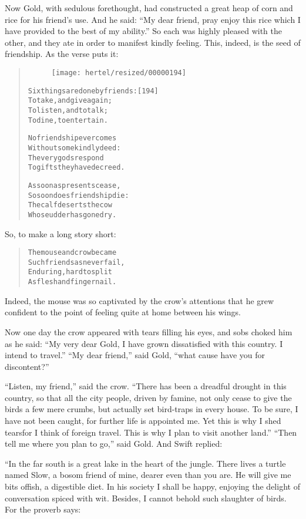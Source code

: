 \documentclass[article, twoside, 10pt]{memoir}
\renewenvironment{verbatim}{%
\begin{quote}%
\vskip -10pt%
\begin{alltt}\normalfont\small}{\end{alltt}%
\end{quote}%
\vskip -10pt
} %
\begin{document}
Now Gold, with sedulous forethought, had constructed a great heap
of corn and rice for his friend's use. And he said:
``My dear friend, pray enjoy this rice which I have provided to the best of my ability.''
So each was highly pleased with the other, and they ate in order to
manifest kindly feeling. This, indeed, is the seed of friendship.
As the verse puts it:

\begin{verbatim}
\begin{figure}[p]\texttt{[image: hertel/resized/00000194]}\end{figure}Six things are done by friends:                         [194]
    To take, and give again;
To listen, and to talk;
    To dine, to entertain.

No friendship ever comes
    Without some kindly deed:
The very gods respond
    To gifts they have decreed.

As soon as presents cease,
    So soon does friendship die:
The calf deserts the cow
    Whose udder has gone dry.
\end{verbatim}
So, to make a long story short:

\begin{verbatim}
The mouse and crow became
    Such friends as never fail,
Enduring, hard to split
    As flesh and finger nail.
\end{verbatim}
Indeed, the mouse was so captivated by the crow's attentions that
he grew confident to the point of feeling quite at home between his
wings.

Now one day the crow appeared with tears filling his eyes, and sobs
choked him as he said:
``My very dear Gold, I have grown dissatisfied with this country. I intend to travel.''
``My dear friend,'' said Gold,
``what cause have you for discontent?''

``Listen, my friend,'' said the crow.
``There has been a dreadful drought in this country, so that all the city people, driven by famine, not only cease to give the birds a few mere crumbs, but actually set bird-traps in every house. To be sure, I have not been caught, for further life is appointed me. Yet this is why I shed tears{\textemdash}for I think of foreign travel. This is why I plan to visit another land.''
``Then tell me where you plan to go,'' said Gold. And Swift
replied:

“In the far south is a great lake in the heart of the jungle. There
lives a turtle named Slow, a bosom friend of mine, dearer even than
you are. He will give me bits offish, a digestible diet. In his
society I shall be happy, enjoying the delight of conversation
spiced with wit. Besides, I cannot behold such slaughter of birds.
For the proverb says:
\end{document}
